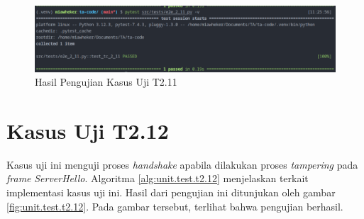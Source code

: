 \begin{figure}[ht]
  \centering
  \includegraphics[width=\textwidth]{chapters/res/appendix-4/2.11.png}
  \caption{Hasil Pengujian Kasus Uji T2.11}
  \label{fig:unit.test.t2.11}
\end{figure}

\section{Kasus Uji T2.12}

Kasus uji ini menguji proses \emph{handshake} apabila dilakukan proses \emph{tampering} pada \emph{frame} \emph{ServerHello}. Algoritma \ref{alg:unit.test.t2.12} menjelaskan terkait implementasi kasus uji ini. Hasil dari pengujian ini ditunjukan oleh gambar \ref{fig:unit.test.t2.12}. Pada gambar tersebut, terlihat bahwa pengujian berhasil.


